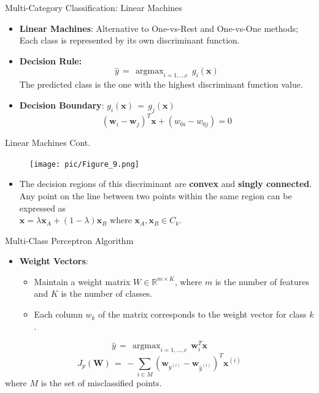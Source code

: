 \documentclass[serif, aspectratio=169]{beamer}
\DeclareMathOperator*{\argmax}{argmax}
\begin{document}
\begin{frame}{Multi-Category Classification: Linear Machines}
    \begin{itemize}\itemsep1.5em
        \item \justifying \textbf{Linear Machines}: Alternative to One-vs-Rest and One-vs-One methods; 
        Each class is represented by its own discriminant function.
        \item \justifying \textbf{Decision Rule:} 
        \[\hat{y} \, = \, \argmax_{i=\text{1,...,c}} \, g_i(\mathbf{x})\]
        The predicted class is the one with the highest discriminant function value.
        \item \textbf{Decision Boundary}:
        \(g_i(\mathbf{x}) \, = \, g_j(\mathbf{x})\)
        \[(\mathbf{w}_i - \mathbf{w}_j)^T\mathbf{x} + (w_{0i} - w_{0j}) = 0\]
    \end{itemize}
\end{frame}


\begin{frame}{Linear Machines Cont.}
    \begin{center}
            \begin{figure}
                \texttt{[image: pic/Figure\_9.png]}
            \end{figure}
        \endminipage
    \end{center}
    \hspace{4cm}
    \begin{itemize}\itemsep1.5em
        \item \justifying The decision regions of this discriminant are \textbf{convex} and \textbf{singly connected}. Any point on the line between two points within the same region can be expressed as \\
\(
\mathbf{x} = \lambda \mathbf{x}_A + (1 - \lambda) \mathbf{x}_B
\)
where \( \mathbf{x}_A, \mathbf{x}_B \in C_k \).

    \end{itemize}
\end{frame}

\begin{frame}{Multi-Class Perceptron Algorithm}
    \begin{itemize}
        \item \textbf{Weight Vectors}:
        \medskip
        \begin{itemize}\itemsep.8em
            \item Maintain a weight matrix \( W \in \mathbb{R}^{m \times K} \), where \( m \) is the number of features and \( K \) is the number of classes.
        \item Each column \( w_k \) of the matrix corresponds to the weight vector for class \( k \).
        \end{itemize}
    \end{itemize}
    \hspace{4cm}
    \[
    \hat{y} \, = \, \argmax_{i=1,...,c} \, \mathbf{w}_i^T \mathbf{x}
    \]
    \[
    J_p(\mathbf{W}) \, = \, - \sum_{i \in M}(\mathbf{w}_{y^{(i)}} - \mathbf{w}_{\hat{y}^{(i)}})^T\mathbf{x}^{(i)}
    \]
    where \( M \) is the set of misclassified points.
\end{frame}
\end{document}
